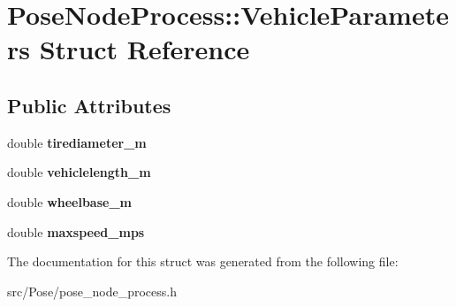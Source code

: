 \hypertarget{structPoseNodeProcess_1_1VehicleParameters}{}\section{Pose\+Node\+Process\+:\+:Vehicle\+Parameters Struct Reference}
\label{structPoseNodeProcess_1_1VehicleParameters}
\subsection*{Public Attributes}
\begin{DoxyCompactItemize}
\item 
\mbox{\label{structPoseNodeProcess_1_1VehicleParameters_a9d5b49cb4fcc6694a27f8e87f18b1552}} 
double {\bfseries tirediameter\+\_\+m}
\item 
\mbox{\label{structPoseNodeProcess_1_1VehicleParameters_a46a783cd870a7e2175e7234bf6a1ce51}} 
double {\bfseries vehiclelength\+\_\+m}
\item 
\mbox{\label{structPoseNodeProcess_1_1VehicleParameters_aa2f7c90b50f83ab5c74474a0e39e2779}} 
double {\bfseries wheelbase\+\_\+m}
\item 
\mbox{\label{structPoseNodeProcess_1_1VehicleParameters_ae4c41dfce0c898a091f54f01fec0ed24}} 
double {\bfseries maxspeed\+\_\+mps}
\end{DoxyCompactItemize}


The documentation for this struct was generated from the following file\+:\begin{DoxyCompactItemize}
\item 
src/\+Pose/pose\+\_\+node\+\_\+process.\+h\end{DoxyCompactItemize}
